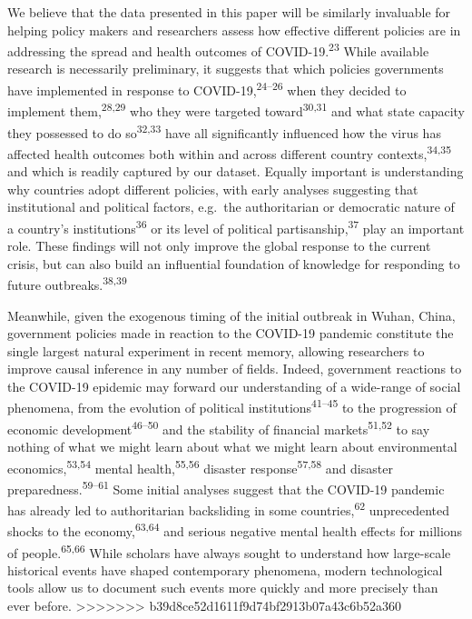 \documentclass[]{article}
\begin{document}
We believe that the data presented in this paper will be similarly invaluable for helping policy makers and researchers assess how effective different policies are in addressing the spread and health outcomes of COVID-19.\textsuperscript{23} While available research is necessarily preliminary, it suggests that which policies governments have implemented in response to COVID-19,\textsuperscript{24--26} when they decided to implement them,\textsuperscript{28,29} who they were targeted toward\textsuperscript{30,31} and what state capacity they possessed to do so\textsuperscript{32,33} have all significantly influenced how the virus has affected health outcomes both within and across different country contexts,\textsuperscript{34,35} and which is readily captured by our dataset. Equally important is understanding why countries adopt different policies, with early analyses suggesting that institutional and political factors, e.g.~the authoritarian or democratic nature of a country's institutions\textsuperscript{36} or its level of political partisanship,\textsuperscript{37} play an important role. These findings will not only improve the global response to the current crisis, but can also build an influential foundation of knowledge for responding to future outbreaks.\textsuperscript{38,39}

Meanwhile, given the exogenous timing of the initial outbreak in Wuhan, China, government policies made in reaction to the COVID-19 pandemic constitute the single largest natural experiment in recent memory, allowing researchers to improve causal inference in any number of fields. Indeed, government reactions to the COVID-19 epidemic may forward our understanding of a wide-range of social phenomena, from the evolution of political institutions\textsuperscript{41--45} to the progression of economic development\textsuperscript{46--50} and the stability of financial markets\textsuperscript{51,52} to say nothing of what we might learn about what we might learn about environmental economics,\textsuperscript{53,54} mental health,\textsuperscript{55,56} disaster response\textsuperscript{57,58} and disaster preparedness.\textsuperscript{59--61} Some initial analyses suggest that the COVID-19 pandemic has already led to authoritarian backsliding in some countries,\textsuperscript{62} unprecedented shocks to the economy,\textsuperscript{63,64} and serious negative mental health effects for millions of people.\textsuperscript{65,66} While scholars have always sought to understand how large-scale historical events have shaped contemporary phenomena, modern technological tools allow us to document such events more quickly and more precisely than ever before.
>>>>>>> b39d8ce52d1611f9d74bf2913b07a43c6b52a360
\end{document}

